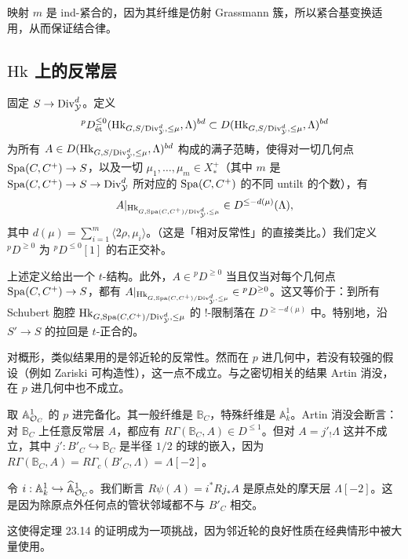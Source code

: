 \begin{remark}
映射 $m$ 是 ind-紧合的，因为其纤维是仿射 Grassmann 簇，所以紧合基变换适用，从而保证结合律。
\end{remark}

\subsection{$\mathrm{Hk}$ 上的反常层}

\begin{definition}
固定 $S\to\Div^d_{\cY}$。定义
\[
{}^pD^{\le0}_{\et}(\mathrm{Hk}_{G,S/\Div^d_{\cY},\le\mu},\Lambda)^{bd}\subset D(\mathrm{Hk}_{G,S/\Div^d_{\cY},\le\mu},\Lambda)^{bd}
\]
为所有 $A\in D(\mathrm{Hk}_{G,S/\Div^d_{\cY},\le\mu},\Lambda)^{bd}$ 构成的满子范畴，使得对一切几何点 $\Spa(C,C^+)\to S$，以及一切 $\mu_1,\ldots,\mu_m\in X^+_*$（其中 $m$ 是 $\Spa(C,C^+)\to S\to\Div^d_{\cY}$ 所对应的 $\Spa(C,C^+)$ 的不同 untilt 的个数），有
\[
A|_{\mathrm{Hk}_{G,\Spa(C,C^+)/\Div^d_{\cY},\le\mu}}\in D^{\le-d(\mu)}(\Lambda),
\]
其中 $d(\mu)=\sum_{i=1}^m\langle2\rho,\mu_i\rangle$。（这是「相对反常性」的直接类比。）我们定义 ${}^pD^{\ge0}$ 为 ${}^pD^{\le0}[1]$ 的右正交补。
\end{definition}

\begin{theorem}
上述定义给出一个 $t$-结构。此外，$A\in{}^pD^{\ge0}$ 当且仅当对每个几何点 $\Spa(C,C^+)\to S$，都有 $A|_{\mathrm{Hk}_{G,\Spa(C,C^+)/\Div^d_{\cY},\le\mu}}\in{}^pD^{\ge0}$。这又等价于：到所有 Schubert 胞腔 $\mathrm{Hk}_{G,\Spa(C,C^+)/\Div^d_{\cY},\le\mu}$ 的 $!$-限制落在 $D^{\ge-d(\mu)}$ 中。特别地，沿 $S'\to S$ 的拉回是 $t$-正合的。
\end{theorem}


\begin{warning}
对概形，类似结果用的是邻近轮的反常性。然而在 $p$ 进几何中，若没有较强的假设（例如 Zariski 可构造性），这一点不成立。与之密切相关的结果 Artin 消没，在 $p$ 进几何中也不成立。
\end{warning}

\begin{example}
取 $\mathbb{A}^1_{\cO_C}$ 的 $p$ 进完备化。其一般纤维是 $\mathbb{B}_C$，特殊纤维是 $\mathbb{A}^1_k$。Artin 消没会断言：对 $\mathbb{B}_C$ 上任意反常层 $A$，都应有 $R\Gamma(\mathbb{B}_C,A)\in D^{\le1}$。但对 $A=j'_!\Lambda$ 这并不成立，其中 $j':B'_C\hookrightarrow\mathbb{B}_C$ 是半径 $1/2$ 的球的嵌入，因为 $R\Gamma(\mathbb{B}_C,A)=R\Gamma_c(B'_C,\Lambda)=\Lambda[-2]$。

令 $i:\mathbb{A}^1_k\hookrightarrow\widehat{\mathbb{A}}^1_{\cO_C}$。我们断言 $R\psi(A)=i^*Rj_*A$ 是原点处的摩天层 $\Lambda[-2]$。这是因为除原点外任何点的管状邻域都不与 $B'_C$ 相交。

这使得定理 23.14 的证明成为一项挑战，因为邻近轮的良好性质在经典情形中被大量使用。
\end{example}

